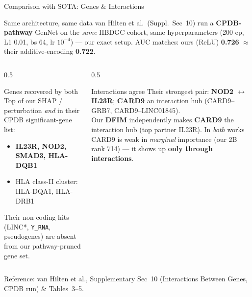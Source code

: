 \documentclass[aspectratio=169]{beamer}
\begin{document}
\begin{frame}{Comparison with SOTA: Genes \& Interactions}
    \small
    \begin{block}{Same architecture, same data}
        \footnotesize
        van Hilten et al.\ (Suppl.\ Sec~10) run a \textbf{CPDB-pathway} GenNet on the \emph{same} IIBDGC cohort,
        same hyperparameters (200 ep, L1 0.01, bs 64, lr $10^{-4}$) --- our exact setup.
        AUC matches: ours (ReLU) \textbf{0.726} $\approx$ their additive-encoding \textbf{0.722}.
    \end{block}
    \begin{columns}[T]
        \begin{column}{0.5\textwidth}
            \begin{block}{Genes recovered by both}
                \footnotesize
                Top of our SHAP / perturbation \emph{and} in their CPDB significant-gene list:
                \begin{itemize}
                    \item \textbf{IL23R, NOD2, SMAD3, HLA-DQB1}
                    \item HLA class-II cluster: HLA-DQA1, HLA-DRB1
                \end{itemize}
                Their non-coding hits (LINC*, \texttt{Y\_RNA}, pseudogenes) are absent from our pathway-pruned gene set.
            \end{block}
        \end{column}
        \begin{column}{0.5\textwidth}
            \begin{block}{Interactions agree}
                \footnotesize
                Their strongest pair: \textbf{NOD2 $\leftrightarrow$ IL23R}; \textbf{CARD9} an interaction hub
                (CARD9--GRB7, CARD9--LINC01845).
                \\[3pt]
                Our \textbf{DFIM} independently makes \textbf{CARD9} the interaction hub (top partner IL23R).
                In \emph{both} works CARD9 is weak in \emph{marginal} importance (our 2B rank 714) --- it shows up
                \textbf{only through interactions}.
            \end{block}
        \end{column}
    \end{columns}
    \vspace{0.05cm}
    \centering\scriptsize
    Reference: van Hilten et al., Supplementary Sec~10 (Interactions Between Genes, CPDB run) \& Tables~3--5.
\end{frame}
\end{document}
